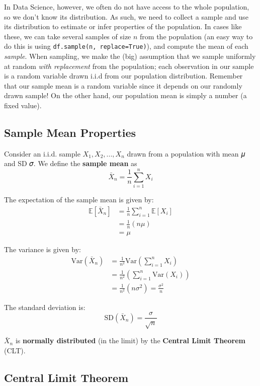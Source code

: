 \documentclass[
  letterpaper,
  DIV=11,
  numbers=noendperiod]{scrreprt}
\begin{document}
In Data Science, however, we often do not have access to the whole
population, so we don't know its distribution. As such, we need to
collect a sample and use its distribution to estimate or infer
properties of the population. In cases like these, we can take several
samples of size \(n\) from the population (an easy way to do this is
using \texttt{df.sample(n,\ replace=True)}), and compute the mean of
each \emph{sample}. When sampling, we make the (big) assumption that we
sample uniformly at random \emph{with replacement} from the population;
each observation in our sample is a random variable drawn i.i.d from our
population distribution. Remember that our sample mean is a random
variable since it depends on our randomly drawn sample! On the other
hand, our population mean is simply a number (a fixed value).

\subsection{Sample Mean Properties}\label{sample-mean-properties}

Consider an i.i.d. sample \(X_1, X_2, ..., X_n\) drawn from a population
with mean 𝜇 and SD 𝜎. We define the \textbf{sample mean} as
\[\bar{X}_n = \frac{1}{n} \sum_{i=1}^n X_i\]

The expectation of the sample mean is given by: \[\begin{align} 
    \mathbb{E}[\bar{X}_n] &= \frac{1}{n} \sum_{i=1}^n \mathbb{E}[X_i] \\
    &= \frac{1}{n} (n \mu) \\
    &= \mu 
\end{align}\]

The variance is given by: \[\begin{align} 
    \text{Var}(\bar{X}_n) &= \frac{1}{n^2} \text{Var}( \sum_{i=1}^n X_i) \\
    &=  \frac{1}{n^2} \left( \sum_{i=1}^n \text{Var}(X_i) \right) \\
    &=  \frac{1}{n^2} (n \sigma^2) = \frac{\sigma^2}{n}
\end{align}\]

The standard deviation is:
\[ \text{SD}(\bar{X}_n) = \frac{\sigma}{\sqrt{n}} \]

\(\bar{X}_n\) is \textbf{normally distributed} (in the limit) by the
\textbf{Central Limit Theorem} (CLT).

\subsection{Central Limit Theorem}\label{central-limit-theorem}
\end{document}
